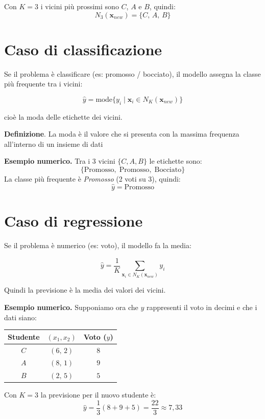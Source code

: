 \documentclass{article}
\begin{document}
	Con $K=3$ i vicini più prossimi sono $C$, $A$ e $B$, quindi:
	\[
	N_3(\mathbf{x}_{new}) = \{C,\, A,\, B\}
	\]
	
	\section*{Caso di classificazione}
	
	Se il problema è classificare (es: promosso / bocciato), il modello assegna la classe più frequente tra i vicini:
	
	\[
	\hat{y} =
	\text{mode}
	\{ y_i \mid \mathbf{x}_i \in N_K(\mathbf{x}_{new}) \}
	\]
	
	cioè la moda delle etichette dei vicini.
	
	\textbf{Definizione}. La moda è il valore  che si presenta con la massima frequenza all'interno di un insieme di dati
	
	\textbf{Esempio numerico.} Tra i 3 vicini $\{C, A, B\}$ le etichette sono:
	\[
	\{\text{Promosso},\; \text{Promosso},\; \text{Bocciato}\}
	\]
	La classe più frequente è \textit{Promosso} (2 voti su 3), quindi:
	\[
	\hat{y} = \text{Promosso}
	\]
	
	\section*{Caso di regressione}
	
	Se il problema è numerico (es: voto), il modello fa la media:
	
	\[
	\hat{y} =
	\frac{1}{K}
	\sum_{\mathbf{x}_i \in N_K(\mathbf{x}_{new})}
	y_i
	\]
	
	Quindi la previsione è la media dei valori dei vicini.
	
	\textbf{Esempio numerico.} Supponiamo ora che $y$ rappresenti il voto in decimi e che i dati siano:
	
	\begin{center}
		\begin{tabular}{ccc}
			\toprule
			Studente & $(x_1, x_2)$ & Voto ($y$) \\
			\midrule
			$C$ & $(6,\,2)$ & $8$ \\
			$A$ & $(8,\,1)$ & $9$ \\
			$B$ & $(2,\,5)$ & $5$ \\
			\bottomrule
		\end{tabular}
	\end{center}
	
	Con $K=3$ la previsione per il nuovo studente è:
	\[
	\hat{y} = \frac{1}{3}(8 + 9 + 5) = \frac{22}{3} \approx 7{,}33
	\]
	
\end{document}
